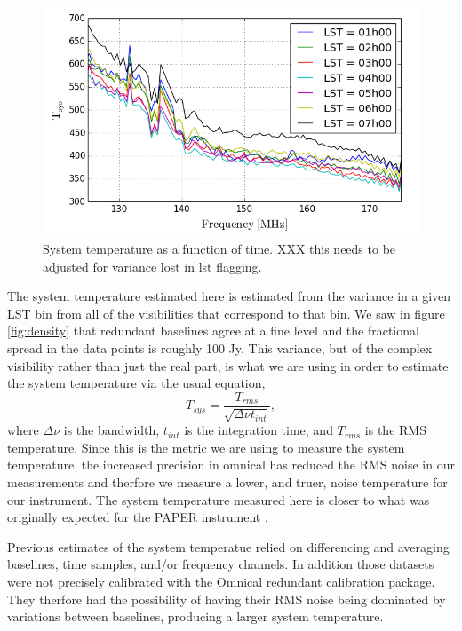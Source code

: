 \documentclass[twocolumn,numberedappendix]{emulateapj} \shorttitle{PSA64}
\begin{document}
\begin{figure}[b!]\centering
\includegraphics[width=\columnwidth]{plots/tsys.png}
\caption{System temperature as a function of time. XXX this needs to be adjusted for variance lost in lst flagging.}
\label{fig:tsys}
\end{figure}

The system temperature estimated here is estimated from the variance in a given
LST bin from all of the visibilities that correspond to that bin. We saw in
figure \ref{fig:density} that redundant baselines agree at a fine level and the
fractional spread in the data points is roughly 100 Jy. This variance, but of
the complex visibility rather than just the real part, is what we are using in
order to estimate the system temperature via the usual equation, 
\begin{equation}
    T_{sys} = \frac{T_{rms}}{\sqrt{\Delta\nu t_{int}}},
\end{equation}
where $\Delta\nu$ is the bandwidth, $t_{int}$ is the integration time, and
$T_{rms}$ is the RMS temperature. Since this is the metric we are using to
measure the system temperature, the increased precision in omnical has reduced
the RMS noise in our measurements and therfore we measure a lower, and truer,
noise temperature for our instrument. The system temperature measured here is
closer to what was originally expected for the PAPER instrument
\citep{parsons_et_al2010}.

Previous estimates of the system temperatue
\citep{parsons_et_al2014,jacobs_et_al2014} relied on differencing and averaging
baselines, time samples, and/or frequency channels. In addition those datasets
were not precisely calibrated with the Omnical redundant calibration package.
They therfore had the possibility of having their RMS noise being dominated by
variations between baselines, producing a larger system temperature.
\end{document}
